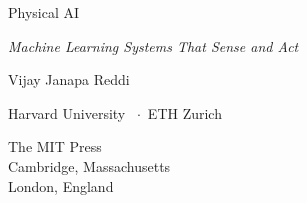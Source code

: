 {\begin{titlepage}
  {\fontsize{15pt}{17pt}\rmfamily\selectfont Physical AI\par}
  \vspace{0.8\baselineskip}
  {\fontsize{12pt}{14pt}\rmfamily\itshape\color{accentcolor}Machine Learning Systems That Sense and Act\par}

  \vspace{10\baselineskip}

  {\fontsize{14pt}{16pt}\rmfamily\selectfont Vijay Janapa Reddi\par}
  \vspace{0.4\baselineskip}
  {\fontsize{10pt}{12pt}\rmfamily\selectfont\color{softink}Harvard University \ $\cdot$\  ETH Zurich\par}

  \vfill

  {\fontsize{11pt}{13pt}\rmfamily\selectfont%
   The MIT Press\\[0.4ex]%
   Cambridge, Massachusetts\\[0.4ex]%
   London, England%
  \par}

  \vspace*{0.02\textheight}
\end{titlepage}%

}
\makeatother
